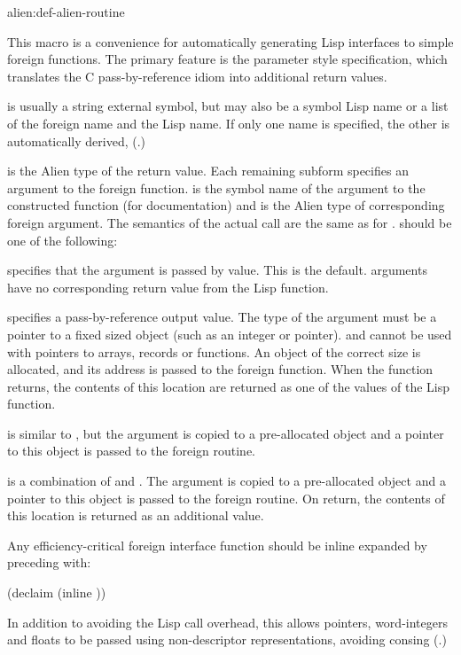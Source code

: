 \begin{defmac}{alien:}{def-alien-routine}{ 
    }
  
  This macro is a convenience for automatically generating Lisp
  interfaces to simple foreign functions.  The primary feature is the
  parameter style specification, which translates the C
  pass-by-reference idiom into additional return values.
  
   is usually a string external symbol, but may also be a
  symbol Lisp name or a list of the foreign name and the Lisp name.
  If only one name is specified, the other is automatically derived,
  (.)
  
   is the Alien type of the return value.  Each
  remaining subform specifies an argument to the foreign function.
   is the symbol name of the argument to the constructed
  function (for documentation) and  is the Alien type of
  corresponding foreign argument.  The semantics of the actual call
  are the same as for .   should be
  one of the following:
  \begin{Lentry}
  \item[\kwd{in}] specifies that the argument is passed by value.
    This is the default.   arguments have no corresponding
    return value from the Lisp function.
  
  \item[\kwd{out}] specifies a pass-by-reference output value.  The
    type of the argument must be a pointer to a fixed sized object
    (such as an integer or pointer).   and 
    cannot be used with pointers to arrays, records or functions.  An
    object of the correct size is allocated, and its address is passed
    to the foreign function.  When the function returns, the contents
    of this location are returned as one of the values of the Lisp
    function.
  
  \item[\kwd{copy}] is similar to , but the argument is copied
    to a pre-allocated object and a pointer to this object is passed
    to the foreign routine.
  
  \item[\kwd{in-out}] is a combination of  and .
    The argument is copied to a pre-allocated object and a pointer to
    this object is passed to the foreign routine.  On return, the
    contents of this location is returned as an additional value.
  \end{Lentry}
  Any efficiency-critical foreign interface function should be inline
  expanded by preceding  with:

\begin{lisp}
(declaim (inline ))
\end{lisp}

  In addition to avoiding the Lisp call overhead, this allows
  pointers, word-integers and floats to be passed using non-descriptor
  representations, avoiding consing (.)
\end{defmac}


